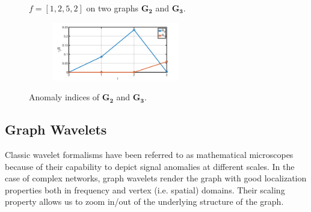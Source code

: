 \begin{figure}[t]
	\centering
    \vspace{-2mm}
	\caption{$f=[1,2,5,2]$ on two graphs $\mathbf{G_2}$ and $\mathbf{G_3}$.}
	\label{fig:f_on_g}
\end{figure}

\begin{figure}[t]
	\centering
    {
		\includegraphics[width= 3in,height=1in] {figures/new_graph.png}
		\label{fig:distribution2}
	}
    \vspace{-2mm}
	\caption{Anomaly indices of $\mathbf{G_2}$ and $\mathbf{G_3}$.}
	\label{fig:new_graph}
\end{figure}


\subsection{Graph Wavelets}
\label{sec:graph_wavelet}
Classic wavelet formalisms have been
referred to as
mathematical microscopes because of their capability to depict
signal anomalies at different scales. In the case of complex networks, graph wavelets render the graph with good localization properties both in frequency and vertex (i.e. spatial) domains. Their scaling property allows us to zoom in/out of the underlying structure of the graph.

